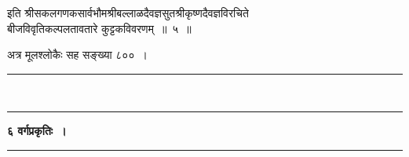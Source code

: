 \documentclass[11pt, openany]{book}
\begin{document}
\begin{sloppypar}
\begin{center}
इति श्रीसकलगणकसार्वभौमश्रीबल्लाळदैवज्ञसुतश्रीकृष्णदैवज्ञविरचिते \\
बीजविवृतिकल्पलतावतारे कुट्टकविवरणम्~॥~५~॥\\
\vspace{1mm}

अत्र मूलश्लोकैः सह सङ्ख्या ८००~।
\vspace{6mm}

\rule{0.2\linewidth}{0.8pt}\\
\vspace{-4mm}

\rule{0.2\linewidth}{0.8pt}
\end{center}
\end{sloppypar}

\newpage
\thispagestyle{empty}

\begin{center}
\textbf{\large ६\; वर्गप्रकृतिः~।}\\
\rule{0.2\linewidth}{0.8pt}
\end{center}
\end{document}

